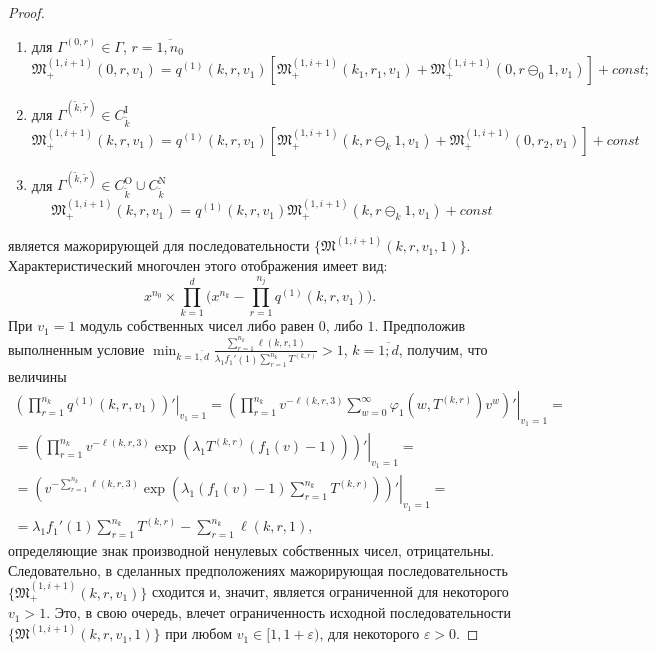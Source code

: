 \documentclass[a4paper,12pt,russian]{extarticle}
\begin{document}
\begin{proof}
\begin{enumerate}
\item для $ \Gamma^{(0,r)} \in \Gamma$, $r = \overline{1,n_0}$ 
$$
\mathfrak{M}_+^{(1,i+1)}(0,r,v_1) = q^{(1)}(k,r,v_1)
[\mathfrak{M}_+^{(1,i+1)}(k_1, r_1,v_1) +\mathfrak{M}_+^{(1,i+1)}(0, r\ominus_0 1,v_1) ] + const;
$$
\item для $\Gamma^{(\tilde{k},\tilde{r})} \in C_{\tilde{k}}^{\mathrm{I}}$
\begin{equation*}
 \mathfrak{M}_+^{(1,i+1)}(k,r,v_1) = q^{(1)}(k,r,v_1) [ \mathfrak{M}_+^{(1,i+1)}(k,r\ominus_{k}1,v_1) +\mathfrak{M}_+^{(1,i+1)}(0,r_2,v_1) ]+ const
\end{equation*}
\item для $\Gamma^{(\tilde{k},\tilde{r})} \in C_{\tilde{k}}^{\mathrm{O}} \cup C_{\tilde{k}}^{\mathrm{N}}$
\begin{equation*}
\mathfrak{M}_+^{(1,i+1)}(k,r,v_1) = q^{(1)}(k,r,v_1) \mathfrak{M}_+^{(1,i+1)}(k,r\ominus_k 1,v_1) + const
\end{equation*}
\end{enumerate}
является мажорирующей для последовательности $\{\mathfrak{M}^{(1,i+1)}(k,r,v_1,1)\}$.
Характеристический многочлен этого отображения имеет вид:
$$
x^{n_0} \times \prod_{k=1}^{d} \big(x^{n_k} - \prod_{r=1}^{n_j}q^{(1)}(k,r,v_1)\big).
$$
При $v_1=1$ модуль собственных чисел либо равен $0$, либо $1$.
Предположив выполненным условие $\min_{k=\overline{1,d}} { \frac{\sum_{r = 1}^{n_k} \ell(k,r,1) }{\lambda_1 f_1'(1) \sum_{r=1}^{n_k} T^{(k,r)} }}>1$, $k=\overline{1;d}$, получим, что величины
\begin{multline}
 \left.\left(\prod_{r=1}^{n_k}q^{(1)}(k,r,v_1)\right) ' \right|_{v_1=1} = 
  \left.\left(\prod_{r=1}^{n_k}v^{-\ell(k,r,3)}\sum_{w=0}^{\infty} \varphi_1(w,T^{(k,r)})v^w \right) ' \right|_{v_1=1} = \\ =
   \left.\left(\prod_{r=1}^{n_k} v^{-\ell(k,r,3)}\exp(\lambda_1 T^{(k,r)} (f_1(v)-1))\right) ' \right|_{v_1=1} = \\ =
    \left.\left(v^{-\sum_{r=1}^{n_k}\ell(k,r,3)}\exp(\lambda_1 (f_1(v)-1)\sum_{r=1}^{n_k} T^{(k,r)}) \right) ' \right|_{v_1=1} = \\ =
\lambda_1 f_1'(1) \sum_{r=1}^{n_k} T^{(k,r)} -\sum_{r=1}^{n_k} \ell(k,r,1), 
\label{derivative:cycle}
\end{multline}
определяющие знак производной ненулевых собственных чисел, отрицательны. Следовательно, в сделанных предположениях мажорирующая последовательность \linebreak $\{\mathfrak{M}_+^{(1,i+1)}(k,r,v_1)\}$ сходится и, значит, является ограниченной для некоторого $v_1>1$. Это, в свою очередь, влечет ограниченность исходной последовательности \linebreak $\{\mathfrak{M}^{(1,i+1)}(k,r,v_1,1)\}$ при любом $v_1 \in [1, 1+\varepsilon)$, для некоторого $\varepsilon > 0$.


\end{proof}
\end{document}
